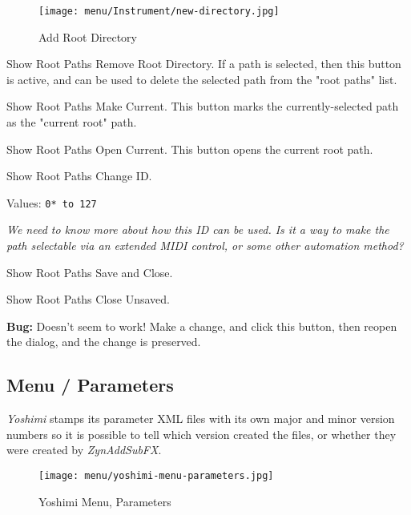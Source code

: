 \begin{figure}[H]
   \centering 
   \texttt{[image: menu/Instrument/new-directory.jpg]}
   \caption{Add Root Directory}
   \label{fig:add_root_directory}
\end{figure}

   Show Root Paths Remove Root Directory.
   If a path is selected, then this button is active, and can be used to
   delete the selected path from the "root paths" list.

   Show Root Paths Make Current.
   This button marks the currently-selected path as the "current root" path.

   Show Root Paths Open Current.
   This button opens the current root path.

   Show Root Paths Change ID.

   Values: \texttt{0* to 127}

   \textsl{
   We need to know more about how this ID can be used.
   Is it a way to make the path selectable via an extended MIDI control, or
   some other automation method?
   }

   Show Root Paths Save and Close.

   Show Root Paths Close Unsaved.

   \textbf{Bug:}
   Doesn't seem to work!
   Make a change, and click this button, then reopen the dialog, 
   and the change is preserved.

\subsection{Menu / Parameters}
\label{subsec:menu_parameters}

   \textsl{Yoshimi} stamps its parameter XML files with its own major and
   minor version numbers so it is possible to tell which version created the
   files, or whether they were created by \textsl{ZynAddSubFX}.

\begin{figure}[H]
   \centering 
   \texttt{[image: menu/yoshimi-menu-parameters.jpg]}
   \caption{Yoshimi Menu, Parameters}
   \label{fig:yoshimi_menu_parameters}
\end{figure}

